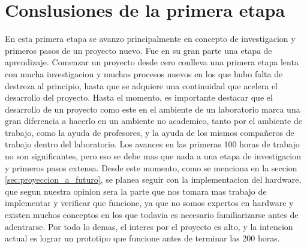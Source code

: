 \section{Conslusiones de la primera etapa} %
\label{sec:conslusiones_de_la_primera_etapa}

En esta primera etapa se avanzo principalmente en concepto de investigacion y primeros pasos de un proyecto nuevo. Fue en su gran parte una etapa de aprendizaje. Comenzar un proyecto desde cero conlleva una primera etapa lenta con mucha investigacion y muchos procesos nuevos en los que hubo falta de destreza al principio, hasta que se adquiere una continuidad que acelera el desarrollo del proyecto. Hasta el momento, es importante destacar que el desarrollo de un proyecto como este en el ambiente de un laboratorio marca una gran diferencia a hacerlo en un ambiente no academico, tanto por el ambiente de trabajo, como la ayuda de profesores, y la ayuda de los mismos compañeros de trabajo dentro del laboratorio. Los avances en las primeras 100 horas de trabajo no son significantes, pero eso se debe mas que nada a una etapa de investigacion y primeros pasos extensa. Desde este momento, como se menciona en la seccion \ref{sec:proyeccion_a_futuro}, se planea seguir con la implementacion del hardware, que segun nuestra opinion sera la parte que nos tomara mas trabajo de implementar y verificar que funcione, ya que no somos expertos en hardware y existen muchos conceptos en los que todavia es necesario familiarizarse antes de adentrarse. Por todo lo demas, el interes por el proyecto es alto, y la intencion actual es lograr un prototipo que funcione antes de terminar las 200 horas.

\clearpage